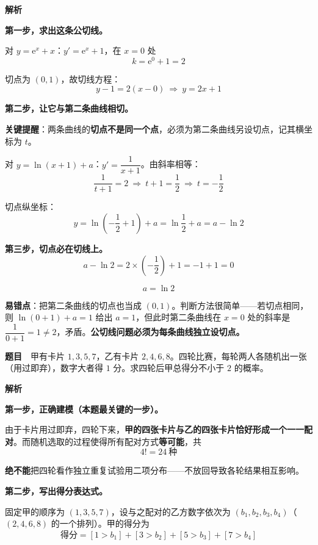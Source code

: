 \textbf{解析}

\textbf{第一步，求出这条公切线。}

对 $y=\mathrm e^{x}+x$：$y'=\mathrm e^{x}+1$，在 $x=0$ 处
\[k=\mathrm e^{0}+1=2\]

切点为 $(0,1)$，故切线方程：
\[y-1=2(x-0)\ \Longrightarrow\ y=2x+1\]

\textbf{第二步，让它与第二条曲线相切。}

\textbf{关键提醒}：两条曲线的\textbf{切点不是同一个点}，必须为第二条曲线另设切点，记其横坐标为 $t$。

对 $y=\ln(x+1)+a$：$y'=\dfrac1{x+1}$。由斜率相等：
\[\frac1{t+1}=2\ \Longrightarrow\ t+1=\frac12\ \Longrightarrow\ t=-\frac12\]

切点纵坐标：
\[y=\ln\left(-\frac12+1\right)+a=\ln\frac12+a=a-\ln2\]

\textbf{第三步，切点必在切线上。}
\[a-\ln2=2\times\left(-\frac12\right)+1=-1+1=0\]

\[a=\ln2\]


\begin{gktip}
\textbf{易错点}：把第二条曲线的切点也当成 $(0,1)$。判断方法很简单——若切点相同，则 $\ln(0+1)+a=1$ 给出 $a=1$，但此时第二条曲线在 $x=0$ 处的斜率是 $\dfrac1{0+1}=1\ne2$，矛盾。\textbf{公切线问题必须为每条曲线独立设切点。}
\end{gktip}

\par\medskip


\textbf{题目}　甲有卡片 $1,3,5,7$，乙有卡片 $2,4,6,8$。四轮比赛，每轮两人各随机出一张（用过即弃），数字大者得 $1$ 分。求四轮后甲总得分不小于 $2$ 的概率。

\textbf{解析}

\textbf{第一步，正确建模（本题最关键的一步）。}

由于卡片用过即弃，四轮下来，\textbf{甲的四张卡片与乙的四张卡片恰好形成一个一一配对}。而随机选取的过程使得所有配对方式\textbf{等可能}，共
\[4!=24\ \text{种}\]

\begin{gktip}
\textbf{绝不能}把四轮看作独立重复试验用二项分布——不放回导致各轮结果相互影响。
\end{gktip}

\textbf{第二步，写出得分表达式。}

固定甲的顺序为 $(1,3,5,7)$，设与之配对的乙方数字依次为 $\left(b_1,b_2,b_3,b_4\right)$（$(2,4,6,8)$ 的一个排列）。甲的得分为
\[\text{得分}=\left[1>b_1\right]+\left[3>b_2\right]+\left[5>b_3\right]+\left[7>b_4\right]\]


